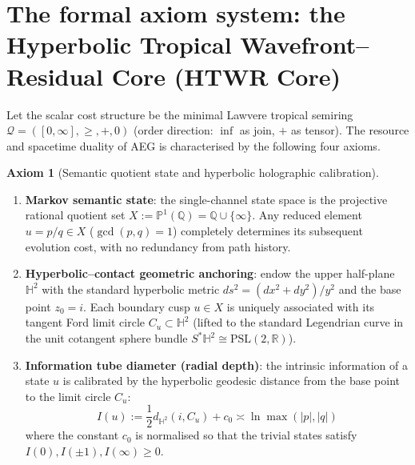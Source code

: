 \documentclass[11pt,a4paper]{article}
\theoremstyle{definition}
\newtheorem{axiom}{Axiom}[section]
\theoremstyle{remark}
\newcommand{\HH}{\mathbb{H}}
\newcommand{\PP}{\mathbb{P}}
\newcommand{\QQ}{\mathbb{Q}}
\newcommand{\RR}{\mathbb{R}}
\newcommand{\cQ}{\mathcal{Q}}
\begin{document}
\section{The formal axiom system: the Hyperbolic Tropical Wavefront--Residual
Core (HTWR Core)}

Let the scalar cost structure be the minimal Lawvere tropical semiring
$\cQ = ([0, \infty], \ge, +, 0)$ (order direction: $\inf$ as join, $+$ as
tensor).  The resource and spacetime duality of AEG is characterised by the
following four axioms.

\begin{axiom}[Semantic quotient state and hyperbolic holographic calibration]
\label{ax:state}
\begin{enumerate}
\item \textbf{Markov semantic state}: the single-channel state space is the
projective rational quotient set $X := \PP^1(\QQ) = \QQ \cup \{\infty\}$.  Any
reduced element $u = p/q \in X$ ($\gcd(p,q)=1$) completely determines its
subsequent evolution cost, with no redundancy from path history.
\item \textbf{Hyperbolic--contact geometric anchoring}: endow the upper
half-plane $\HH^2$ with the standard hyperbolic metric $ds^2 = (dx^2 + dy^2)/y^2$
and the base point $z_0 = i$.  Each boundary cusp $u \in X$ is uniquely associated
with its tangent Ford limit circle $C_u \subset \HH^2$ (lifted to the standard
Legendrian curve in the unit cotangent sphere bundle
$S^*\HH^2 \cong \mathrm{PSL}(2, \RR)$).
\item \textbf{Information tube diameter (radial depth)}: the intrinsic
information of a state $u$ is calibrated by the hyperbolic geodesic distance from
the base point to the limit circle $C_u$:
\[
I(u) := \frac{1}{2} d_{\HH^2}(i, C_u) + c_0 \asymp \ln \max(|p|, |q|)
\]
where the constant $c_0$ is normalised so that the trivial states satisfy
$I(0), I(\pm 1), I(\infty) \ge 0$.
\end{enumerate}
\end{axiom}
\end{document}
